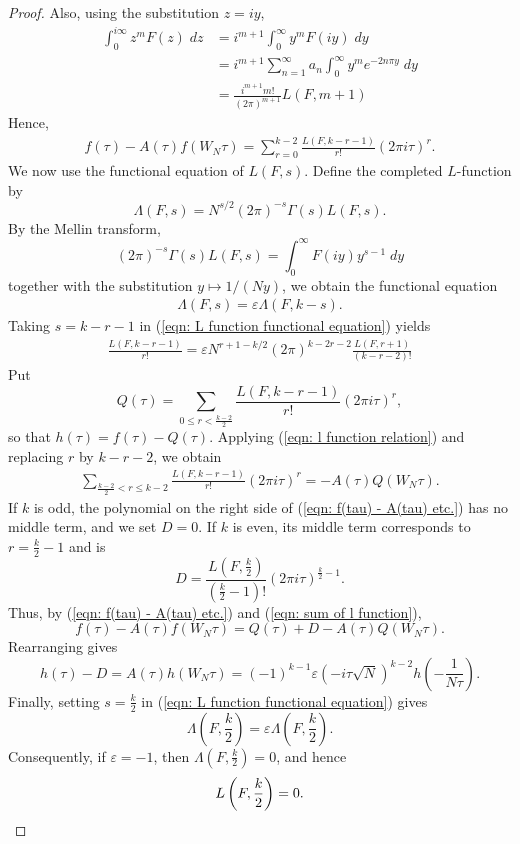\documentclass[12pt, a4paper]{amsart}
\theoremstyle{definition}
\numberwithin{theorem}{section}
\begin{document}
\begin{proof}
Also, using the substitution $z=iy$, \begin{align*}
\int_{0}^{i\infty}z^mF\left(z\right)\;dz&=i^{m+1}\int_{0}^{\infty}y^mF\left(iy\right)\;dy\\\
&=i^{m+1}\sum_{n=1}^{\infty}a_n\int_{0}^{\infty}y^me^{-2n\pi y}\;dy\\
&=\frac{i^{m+1}m!}{\left(2\pi\right)^{m+1}}L\left(F,m+1\right)
\end{align*}
Hence,
\begin{align}\label{eqn: f(tau) - A(tau) etc.}
f\left(\tau\right)-A\left(\tau\right)f\left(W_N\tau\right)=\sum_{r=0}^{k-2}\frac{L\left(F,k-r-1\right)}{r!}\left(2\pi i\tau\right)^r.
\end{align} We now use the functional equation of $L\left(F,s\right)$. Define the completed $L$-function by \[\Lambda\left(F,s\right)=N^{s/2}\left(2\pi\right)^{-s}\Gamma\left(s\right)L\left(F,s\right).\] By the Mellin transform, \[\left(2\pi\right)^{-s}\Gamma\left(s\right)L\left(F,s\right)=\int_{0}^{\infty}F\left(iy\right)y^{s-1}\;dy\] together with the substitution $y\mapsto1/\left(Ny\right)$, we obtain the functional equation
\begin{align}\label{eqn: L function functional equation}
\Lambda\left(F,s\right)=\varepsilon\Lambda\left(F,k-s\right).
\end{align} Taking $s=k-r-1$ in (\ref{eqn: L function functional equation}) yields \begin{align}\label{eqn: l function relation}
\frac{L\left(F,k-r-1\right)}{r!}=\varepsilon N^{r+1-k/2}\left(2\pi\right)^{k-2r-2}\frac{L\left(F,r+1\right)}{\left(k-r-2\right)!}
\end{align} Put \[Q\left(\tau\right)=\sum_{0\le r<\frac{k-2}{2}}\frac{L\left(F,k-r-1\right)}{r!}\left(2\pi i\tau\right)^r,\] so that $h\left(\tau\right)=f\left(\tau\right)-Q\left(\tau\right)$. Applying (\ref{eqn: l function relation}) and replacing $r$ by $k-r-2$, we obtain \begin{align}\label{eqn: sum of l function} 
\sum_{\frac{k-2}{2}<r\le k-2}\frac{L\left(F,k-r-1\right)}{r!}\left(2\pi i\tau\right)^r=-A\left(\tau\right)Q\left(W_N\tau\right).
\end{align} If $k$ is odd, the polynomial on the right side of (\ref{eqn: f(tau) - A(tau) etc.}) has no middle term, and we set $D=0$. If $k$ is even, its middle term corresponds to $r=\frac{k}{2}-1$ and is \[D=\frac{L\left(F,\frac{k}{2}\right)}{\left(\frac{k}{2}-1\right)!}\left(2\pi i\tau\right)^{\frac{k}{2}-1}.\] Thus, by (\ref{eqn: f(tau) - A(tau) etc.}) and (\ref{eqn: sum of l function}), \[f\left(\tau\right)-A\left(\tau\right)f\left(W_N\tau\right)=Q\left(\tau\right)+D-A\left(\tau\right)Q\left(W_N\tau\right).\] Rearranging gives \[h\left(\tau\right)-D=A\left(\tau\right)h\left(W_N\tau\right)=\left(-1\right)^{k-1}\varepsilon\left(-i\tau\sqrt{N}\right)^{k-2}h\left(-\frac{1}{N\tau}\right).\] Finally, setting $s=\frac{k}{2}$ in (\ref{eqn: L function functional equation}) gives \[\Lambda\left(F,\frac{k}{2}\right)=\varepsilon\Lambda\left(F,\frac{k}{2}\right).\] Consequently, if $\varepsilon=-1$, then $\Lambda\left(F,\frac{k}{2}\right)=0$, and hence \[L\left(F,\frac{k}{2}\right)=0.\qedhere\]
\end{proof}
\end{document}
